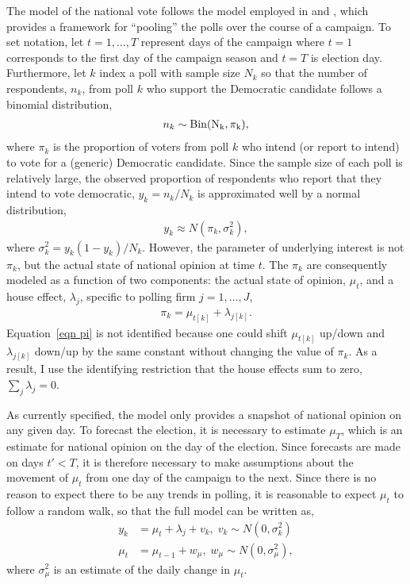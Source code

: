 \documentclass[12pt,final,fleqn]{article}
\theoremstyle{plain}
\begin{document}
The model of the national vote follows the model employed in \citet{jackman2005pooling} and \citet{jackman2009bayesian}, which provides a framework for ``pooling'' the polls over the course of a campaign. To set notation, let $t=1,\ldots,T$ represent days of the campaign where $t=1$ corresponds to the first day of the campaign season and $t=T$ is election day. Furthermore, let $k$ index a poll with sample size $N_k$ so that the number of respondents, $n_k$, from poll $k$ who support the Democratic candidate follows a binomial distribution,
\begin{align}
n_k \sim \rm{Bin}(N_k, \pi_k),
\end{align}
where $\pi_k$ is the proportion of voters from poll $k$ who intend (or report to intend) to vote for a (generic) Democratic candidate. Since the sample size of each poll is relatively large, the observed proportion of respondents who report that they intend to vote democratic, $y_k = n_k/N_k$ is approximated well by a normal distribution,
\begin{align}
y_k \approx N(\pi_k, \sigma^2_k),
\end{align}
where $\sigma^2_k= y_k(1-y_k)/N_k$. However, the parameter of underlying interest is not $\pi_k$, but the actual state of national opinion at time $t$. The $\pi_k$ are consequently modeled as a function of two components: the actual state of opinion, $\mu_t$, and a house effect, $\lambda_j$, specific to polling firm $j = 1,\ldots, J$,
\begin{align} \label{eqn pi}
\pi_k = \mu_{t[k]} + \lambda_{j[k]}.
\end{align}
Equation~\ref{eqn pi} is not identified because one could shift $\mu_{t[k]}$ up/down and $\lambda_{j[k]}$ down/up by the same constant without changing the value of $\pi_k$. As a result, I use the identifying restriction that the house effects sum to zero, $\sum_j \lambda_j = 0$.

As currently specified, the model only provides a snapshot of national opinion on any given day. To forecast the election, it is necessary to estimate $\mu_T$, which is an estimate for national opinion on the day of the election. Since forecasts are made on days $t' <T$, it is therefore necessary to make assumptions about the movement of $\mu_t$ from one day of the campaign to the next. Since there is no reason to expect there to be any trends in polling, it is reasonable to expect $\mu_t$ to follow a random walk, so that the full model can be written as,
\begin{align}
\label{observation eqn national}
y_k &= \mu_{t} + \lambda_{j} + v_k, \; v_k\sim N(0, \sigma^2_k)\\ 
\label{system eqn national}
\mu_{t} &= \mu_{t-1} + w_\mu, \; w_\mu \sim N(0, \sigma^2_{\mu}),
\end{align}
where $\sigma^2_\mu$ is an estimate of the daily change in $\mu_t$.
\end{document}
